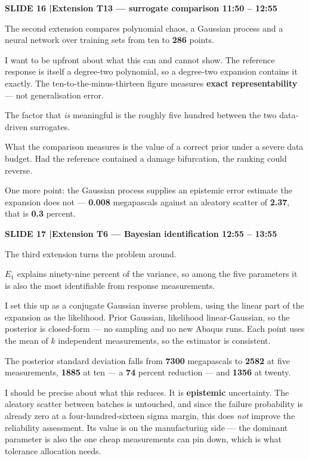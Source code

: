 \documentclass[12pt,a4paper]{article}
\newcommand{\slide}[3]{%
  \bigskip
  \noindent\colorbox{luhblue}{\parbox{\dimexpr\linewidth-2\fboxsep}{%
    \color{white}\bfseries\small SLIDE #1 \quad|\quad #2 \hfill #3}}\par
  \nopagebreak\vspace{0.3em}}
\newcommand{\num}[1]{\textbf{#1}}
\begin{document}
\slide{16}{Extension T13 --- surrogate comparison}{11:50 -- 12:55}

The second extension compares polynomial chaos, a Gaussian process and a neural network
over training sets from ten to \num{286} points.

I want to be upfront about what this can and cannot show. The reference response is itself
a degree-two polynomial, so a degree-two expansion contains it exactly. The
ten-to-the-minus-thirteen figure measures \textbf{exact representability} --- not
generalisation error.

The factor that \emph{is} meaningful is the roughly five hundred between the two
data-driven surrogates.

What the comparison measures is the value of a correct prior under a severe data budget.
Had the reference contained a damage bifurcation, the ranking could reverse.

One more point: the Gaussian process supplies an epistemic error estimate the expansion
does not --- \num{0.008} megapascals against an aleatory scatter of \num{2.37}, that
is \num{0.3} percent.

\slide{17}{Extension T6 --- Bayesian identification}{12:55 -- 13:55}

The third extension turns the problem around.

$E_1$ explains ninety-nine percent of the variance, so among the five parameters it is
also the most identifiable from response measurements.

I set this up as a conjugate Gaussian inverse problem, using the linear part of the
expansion as the likelihood. Prior Gaussian, likelihood linear-Gaussian, so the posterior
is closed-form --- no sampling and no new Abaqus runs. Each point uses the mean of $k$
independent measurements, so the estimator is consistent.

The posterior standard deviation falls from \num{7300} megapascals to \num{2582}
at five measurements, \num{1885} at ten --- a \num{74} percent reduction --- and
\num{1356} at twenty.

I should be precise about what this reduces. It is \textbf{epistemic} uncertainty. The
aleatory scatter between batches is untouched, and since the failure probability is
already zero at a four-hundred-sixteen sigma margin, this does \emph{not} improve the
reliability assessment. Its value is on the manufacturing side --- the dominant parameter
is also the one cheap measurements can pin down, which is what tolerance allocation
needs.
\end{document}
